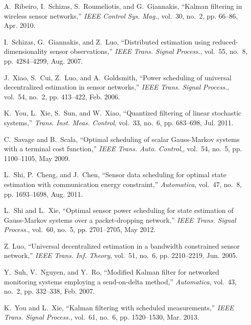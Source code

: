 \documentclass[journal]{IEEEtran}
\begin{document}
\begin{thebibliography}{10}
A.~Ribeiro, I.~Schizas, S.~Roumeliotis, and G.~Giannakis, ``Kalman filtering in
  wireless sensor networks,'' \emph{IEEE Control Sys. Mag.}, vol.~30, no.~2, pp.
  66--86, Apr. 2010.

I.~Schizas, G.~Giannakis, and Z.~Luo, ``Distributed estimation using
  reduced-dimensionality sensor observations,'' \emph{IEEE Trans. Signal Process.},
   vol.~55, no.~8, pp. 4284--4299, Aug. 2007.

{}

J.~Xiao, S.~Cui, Z.~Luo, and A.~Goldsmith, ``Power scheduling of universal
  decentralized estimation in sensor networks,'' \emph{IEEE Trans. Signal Process.},
   vol.~54, no.~2, pp. 413--422, Feb. 2006.

K.~You, L.~Xie, S.~Sun, and W.~Xiao, ``Quantized filtering of linear stochastic
  systems,'' \emph{Trans. Inst. Meas. Control},
  vol.~33, no.~6, pp. 683--698, Jul. 2011.

C.~Savage and B.~Scala, ``Optimal scheduling of scalar Gauss-Markov systems
  with a terminal cost function,'' \emph{IEEE Trans. Auto. Control},, vol.~54, no.~5,
  pp. 1100--1105, May 2009.

L.~Shi, P.~Cheng, and J.~Chen, ``Sensor data scheduling for optimal state
  estimation with communication energy constraint,'' \emph{Automatica},
  vol.~47, no.~8, pp. 1693--1698, Aug. 2011.

L.~Shi and L.~Xie, ``Optimal sensor power scheduling for state estimation of
  Gauss-Markov systems over a packet-dropping network,'' \emph{IEEE Trans. Signal Process.},
   vol.~60, no.~5, pp. 2701--2705, May 2012.


Z. Luo, ``Universal decentralized estimation in a bandwidth constrained
  sensor network,'' \emph{IEEE Trans. Inf. Theory}, vol.~51,
  no.~6, pp. 2210--2219, Jun. 2005.

Y.~Suh, V.~Nguyen, and Y.~Ro, ``Modified Kalman filter for networked monitoring
  systems employing a send-on-delta method,'' \emph{Automatica}, vol.~43,
  no.~2, pp. 332--338, Feb. 2007.

K.~You and L.~Xie, ``Kalman filtering with scheduled measurements,'' \emph{IEEE Trans. Signal Process.},
 vol.~61, no.~6, pp. 1520--1530, Mar. 2013.


\end{thebibliography}
\end{document}
